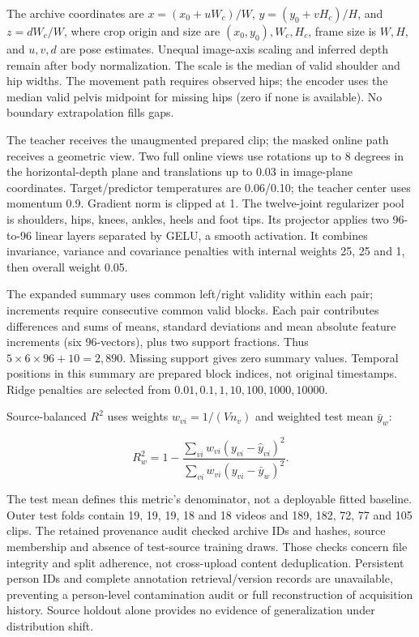 \documentclass{article}
\begin{document}
The archive coordinates are \(x=(x_0+uW_c)/W\), \(y=(y_0+vH_c)/H\), and
\(z=dW_c/W\), where crop origin and size are \((x_0,y_0),W_c,H_c\),
frame size is \(W,H\), and \(u,v,d\) are pose estimates. Unequal
image-axis scaling and inferred depth remain after body normalization.
The scale is the median of valid shoulder and hip widths. The movement
path requires observed hips; the encoder uses the median valid pelvis
midpoint for missing hips (zero if none is available). No boundary
extrapolation fills gaps.

The teacher receives the unaugmented prepared clip; the masked online
path receives a geometric view. Two full online views use rotations up
to 8 degrees in the horizontal-depth plane and translations up to 0.03
in image-plane coordinates. Target/predictor temperatures are 0.06/0.10;
the teacher center uses momentum 0.9. Gradient norm is clipped at 1. The
twelve-joint regularizer pool is shoulders, hips, knees, ankles, heels
and foot tips. Its projector applies two 96-to-96 linear layers
separated by GELU, a smooth activation. It combines invariance, variance
and covariance penalties with internal weights 25, 25 and 1, then
overall weight 0.05.

The expanded summary uses common left/right validity within each pair;
increments require consecutive common valid blocks. Each pair
contributes differences and sums of means, standard deviations and mean
absolute feature increments (six 96-vectors), plus two support
fractions. Thus \(5\times6\times96+10=2,890\). Missing support gives
zero summary values. Temporal positions in this summary are prepared
block indices, not original timestamps. Ridge penalties are selected
from \(0.01,0.1,1,10,100,1000,10000\).

Source-balanced \(R^2\) uses weights \(w_{vi}=1/(Vn_v)\) and weighted
test mean \(\bar y_w\):

\[R_w^2=1-\frac{\sum_{vi}w_{vi}(y_{vi}-\hat y_{vi})^2}{\sum_{vi}w_{vi}(y_{vi}-\bar y_w)^2}.\]

The test mean defines this metric's denominator, not a deployable fitted
baseline. Outer test folds contain 19, 19, 19, 18 and 18 videos and 189,
182, 72, 77 and 105 clips. The retained provenance audit checked archive
IDs and hashes, source membership and absence of test-source training
draws. Those checks concern file integrity and split adherence, not
cross-upload content deduplication. Persistent person IDs and complete
annotation retrieval/version records are unavailable, preventing a
person-level contamination audit or full reconstruction of acquisition
history. Source holdout alone provides no evidence of generalization
under distribution shift.
\end{document}
